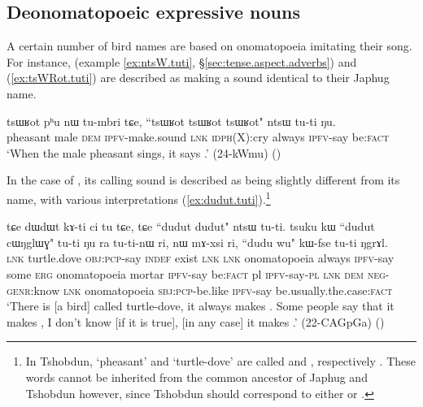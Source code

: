 \subsection{Deonomatopoeic expressive nouns} \label{sec:underived.expressive.nouns}
A certain number of bird names are based on onomatopoeia imitating their song. For instance,   (example \ref{ex:ntsW.tuti}, §\ref{sec:tense.aspect.adverbs})  and  (\ref{ex:tsWRot.tuti}) are described as making a sound identical to their Japhug name.

\begin{exe}
\ex \label{ex:tsWRot.tuti}
\gll  tsɯʁot pʰu nɯ tu-mbri tɕe, {``tsɯʁot tsɯʁot tsɯʁot"} ntsɯ tu-ti ŋu. \\
pheasant male \textsc{dem} \textsc{ipfv}-make.sound \textsc{lnk} \textsc{idph}(X):cry always \textsc{ipfv}-say  be:\textsc{fact} \\
\glt `When the male pheasant sings, it says .' (24-kWmu) 	()
\end{exe}

In the case of  , its calling sound is described as being slightly different from its name, with various interpretations (\ref{ex:dudut.tuti}).\footnote{In Tshobdun, `pheasant' and `turtle-dove' are called  and , respectively \citep[137]{jackson19tshobdun}. These words cannot be inherited from the common ancestor of Japhug and Tshobdun however, since Tshobdun  should correspond to either  or . }

\begin{exe}
\ex \label{ex:dudut.tuti}
\gll tɕe dɯdɯt kɤ-ti ci tu tɕe, tɕe {``dudut dudut"}  ntsɯ tu-ti. tsuku kɯ ``dudut cɯŋglɯɣ" tu-ti ŋu ra tu-ti-nɯ ri, nɯ mɤ-xsi ri, {``dudu wu"} kɯ-fse tu-ti ŋgrɤl. \\
\textsc{lnk} turtle.dove \textsc{obj}:\textsc{pcp}-say \textsc{indef} exist \textsc{lnk} \textsc{lnk} onomatopoeia always \textsc{ipfv}-say some \textsc{erg} onomatopoeia mortar \textsc{ipfv}-say  be:\textsc{fact} pl \textsc{ipfv}-say-\textsc{pl} \textsc{lnk} \textsc{dem} \textsc{neg}-\textsc{genr}:know \textsc{lnk} onomatopoeia \textsc{sbj}:\textsc{pcp}-be.like \textsc{ipfv}-say be.usually.the.case:\textsc{fact} \\
\glt `There is [a bird] called turtle-dove, it always makes . Some people say that it makes , I don't know [if it is true], [in any case] it makes .' (22-CAGpGa)
()
\end{exe}

